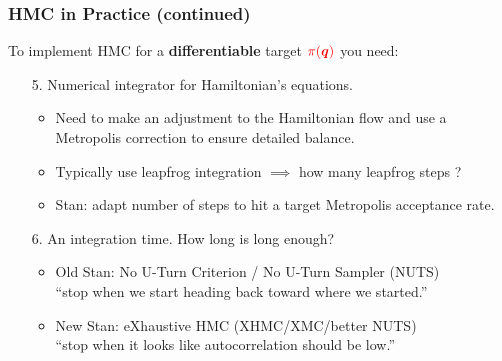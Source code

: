 \documentclass[xcolor=dvipsnames]{beamer}
\begin{document}
\begin{frame}
\frametitle{HMC in Practice (continued)}
To implement HMC for a \textbf{differentiable} target ${\color{red}\pi(\bm{q})}$ you need:
\vspace{0.2cm}
\begin{enumerate}
\item[5.] Numerical integrator for Hamiltonian's equations.
\begin{itemize}
\item Need to make an adjustment to the Hamiltonian flow and use a Metropolis correction to ensure detailed balance.
\vspace{0.2cm}
\item Typically use leapfrog integration $\implies$ how many leapfrog steps ?
\vspace{0.2cm}
\item Stan: adapt number of steps to hit a target Metropolis acceptance rate.
\end{itemize}
\vspace{0.2cm}
\item[6.] An integration time. How long is long enough?
\begin{itemize}
\item Old Stan: No U-Turn Criterion / No U-Turn Sampler (NUTS) \\
\vspace{0.2cm}
``stop when we start heading back toward where we started.''
\vspace{0.2cm}
\item New Stan: eXhaustive HMC (XHMC/XMC/better NUTS) \\
\vspace{0.2cm}
``stop when it looks like autocorrelation should be low.''
\vspace{0.2cm}
\end{itemize}
\end{enumerate}
\end{frame}
\end{document}
